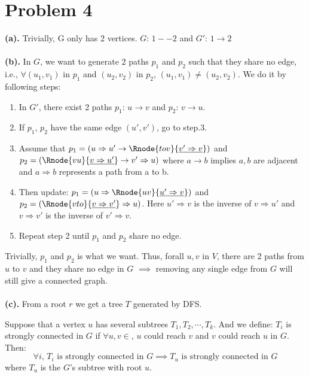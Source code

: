 \documentclass{article}
\begin{document}
\section*{Problem 4}
\textbf{(a).} Trivially, G only has 2 vertices. $G$: $1--2$ and $G'$:  $1\longrightarrow 2$
\\\\
\textbf{(b).}
In $G$, we want to generate 2 paths $p_1$ and $p_2$ such that they share no edge, i.e., $\forall (u_1,v_1)$ in $p_1$ and $(u_2,v_2)$ in $p_2$, $(u_1,v_1)\ne (u_2,v_2)$. We do it by following steps:
\begin{enumerate}
	\item 
		In $G'$, there exist 2 paths $p_1$: $u\to v$ and $p_2$: $v\to u$.
	\item
		If $p_1$, $p_2$ have the same edge $(u',v')$, go to step.3.
	\item
		Assume that $p_1=(u\Rightarrow u'\to \Rnode{tov}{\underline{v'\Rightarrow v}})$ and $p_2=(\Rnode{vu}{\underline{v\Rightarrow u'}}\to v'\Rightarrow u)$ where $a\to b$ implies $a,b$ are adjacent and $a\Rightarrow b$ represents a path from a to b.
	\item Then update:
		$p_1=(u\Rightarrow \Rnode{uv}{\underline{u'\Rightarrow v}})$ and 
		$p_2=(\Rnode{vto}{\underline{v\Rightarrow v'}}\Rightarrow u)$.
		Here $u'\Rightarrow v$ is the inverse of $v\Rightarrow u'$ and $v\Rightarrow v'$ is the inverse of  $v'\Rightarrow v$.
	\item Repeat step 2 until $p_1$ and $p_2$ share no edge.
\end{enumerate}
Trivially, $p_1$ and $p_2$ is what we want. Thus, forall $u,v$ in $V$, there are 2 paths from $u$ to $v$ and they share no edge in $G$ $\implies$ removing any single edge from $G$ will still give a connected graph.
\\\\
\textbf{(c).}
From a root $r$ we get a tree $T$ generated by DFS.
\begin{lemma}
	\label{ct}
	Suppose that a vertex $u$ has several subtrees $T_1,T_2,\cdots,T_k$. And we define: $T_i$ is strongly connected in $G$ if $\forall u,v\in$, $u$ could reach $v$ and $v$ could reach $u$ in $G$. Then:
	\[
		\forall i,\,T_i\text{ is strongly connected in }G
		\implies
		T_u\text{ is strongly connected in }G
	\] where $T_u$ is the $G$'s subtree with root $u$.
\end{lemma}
\end{document}
